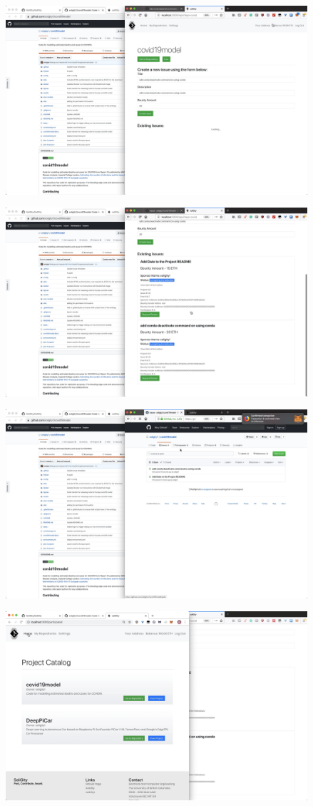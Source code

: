 \documentclass[12pt]{article}
\renewcommand{\_}{\kern-1.5pt\textunderscore\kern-1.5pt}
\begin{document}
\includegraphics[height=7cm]{graphs/27. alice_create_issue2}

\includegraphics[height=7cm]{graphs/28. soligity_issues}

\includegraphics[height=7cm]{graphs/29. github_issues}

\includegraphics[height=7cm]{graphs/30. project_catalog_bob_view}
\end{document}
